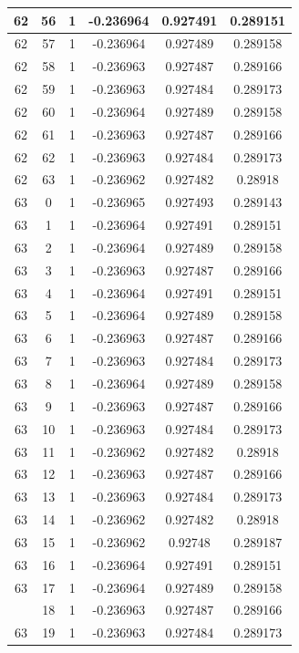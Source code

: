 \documentclass[12pt,a4paper]{article}
\numberwithin{equation}{section}
\numberwithin{figure}{section}
\numberwithin{table}{section}
\begin{document}
\begin{longtable}{|c|c|c|c|c|c|}
62 & 56 & 1 & -0.236964 & 0.927491 & 0.289151 \\ \hline
62 & 57 & 1 & -0.236964 & 0.927489 & 0.289158 \\ \hline
62 & 58 & 1 & -0.236963 & 0.927487 & 0.289166 \\ \hline
62 & 59 & 1 & -0.236963 & 0.927484 & 0.289173 \\ \hline
62 & 60 & 1 & -0.236964 & 0.927489 & 0.289158 \\ \hline
62 & 61 & 1 & -0.236963 & 0.927487 & 0.289166 \\ \hline
62 & 62 & 1 & -0.236963 & 0.927484 & 0.289173 \\ \hline
62 & 63 & 1 & -0.236962 & 0.927482 & 0.28918 \\ \hline
63 & 0 & 1 & -0.236965 & 0.927493 & 0.289143 \\ \hline
63 & 1 & 1 & -0.236964 & 0.927491 & 0.289151 \\ \hline
63 & 2 & 1 & -0.236964 & 0.927489 & 0.289158 \\ \hline
63 & 3 & 1 & -0.236963 & 0.927487 & 0.289166 \\ \hline
63 & 4 & 1 & -0.236964 & 0.927491 & 0.289151 \\ \hline
63 & 5 & 1 & -0.236964 & 0.927489 & 0.289158 \\ \hline
63 & 6 & 1 & -0.236963 & 0.927487 & 0.289166 \\ \hline
63 & 7 & 1 & -0.236963 & 0.927484 & 0.289173 \\ \hline
63 & 8 & 1 & -0.236964 & 0.927489 & 0.289158 \\ \hline
63 & 9 & 1 & -0.236963 & 0.927487 & 0.289166 \\ \hline
63 & 10 & 1 & -0.236963 & 0.927484 & 0.289173 \\ \hline
63 & 11 & 1 & -0.236962 & 0.927482 & 0.28918 \\ \hline
63 & 12 & 1 & -0.236963 & 0.927487 & 0.289166 \\ \hline
63 & 13 & 1 & -0.236963 & 0.927484 & 0.289173 \\ \hline
63 & 14 & 1 & -0.236962 & 0.927482 & 0.28918 \\ \hline
63 & 15 & 1 & -0.236962 & 0.92748 & 0.289187 \\ \hline
63 & 16 & 1 & -0.236964 & 0.927491 & 0.289151 \\ \hline
63 & 17 & 1 & -0.236964 & 0.927489 & 0.289158 \\ \hline
\pagebreak
63 & 18 & 1 & -0.236963 & 0.927487 & 0.289166 \\ \hline
63 & 19 & 1 & -0.236963 & 0.927484 & 0.289173 \\ \hline

\end{longtable}
\end{document}
